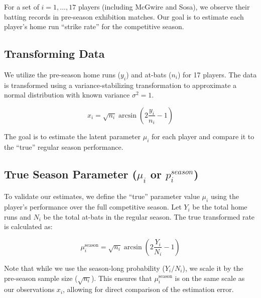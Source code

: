\documentclass[
  letterpaper,
  DIV=11,
  numbers=noendperiod]{scrreprt}
\renewcommand{\[}{\begin{equation}}
\renewcommand{\]}{\end{equation}}
\theoremstyle{definition}
\theoremstyle{plain}
\theoremstyle{plain}
\theoremstyle{plain}
\theoremstyle{definition}
\theoremstyle{plain}
\theoremstyle{remark}
\begin{document}
For a set of \(i = 1, \dots, 17\) players (including McGwire and Sosa),
we observe their batting records in pre-season exhibition matches. Our
goal is to estimate each player's home run ``strike rate'' for the
competitive season.

\subsection{Transforming Data}\label{transforming-data}

We utilize the pre-season home runs (\(y_i\)) and at-bats (\(n_i\)) for
17 players. The data is transformed using a variance-stabilizing
transformation to approximate a normal distribution with known variance
\(\sigma^2 = 1\).

\[
x_i = \sqrt{n_i} \arcsin\left( 2 \frac{y_i}{n_i} - 1 \right)
\]

The goal is to estimate the latent parameter \(\mu_i\) for each player
and compare it to the ``true'' regular season performance.

\subsection{\texorpdfstring{True Season Parameter (\(\mu_i\) or
\(p_i^{season}\))}{True Season Parameter (\textbackslash mu\_i or p\_i\^{}\{season\})}}\label{true-season-parameter-mu_i-or-p_iseason}

To validate our estimates, we define the ``true'' parameter value
\(\mu_i\) using the player's performance over the full competitive
season. Let \(Y_i\) be the total home runs and \(N_i\) be the total
at-bats in the regular season. The true transformed rate is calculated
as:

\[
\mu_i^{\text{season}} = \sqrt{n_i} \arcsin\left( 2 \frac{Y_i}{N_i} - 1 \right)
\]

Note that while we use the season-long probability (\(Y_i/N_i\)), we
scale it by the pre-season sample size (\(\sqrt{n_i}\)). This ensures
that \(\mu_i^{\text{season}}\) is on the same scale as our observations
\(x_i\), allowing for direct comparison of the estimation error.
\end{document}
